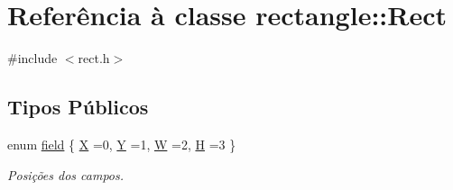 \hypertarget{classrectangle_1_1Rect}{\section{Referência à classe rectangle\-:\-:Rect}
\label{classrectangle_1_1Rect}
}


{\ttfamily \#include $<$rect.\-h$>$}

\subsection*{Tipos Públicos}
\begin{DoxyCompactItemize}
\item 
enum \hyperlink{classrectangle_1_1Rect_aadf60e07e4109c5fd25992fa057f8f02}{field} \{ \hyperlink{classrectangle_1_1Rect_aadf60e07e4109c5fd25992fa057f8f02abfd646e70d5cb6131897257d881c2d74}{X} =0, 
\hyperlink{classrectangle_1_1Rect_aadf60e07e4109c5fd25992fa057f8f02a791ad52b314764b48b5591fd780ef01d}{Y} =1, 
\hyperlink{classrectangle_1_1Rect_aadf60e07e4109c5fd25992fa057f8f02a4391d7047d7c16bf113e2049bd552a0a}{W} =2, 
\hyperlink{classrectangle_1_1Rect_aadf60e07e4109c5fd25992fa057f8f02ad988b7f76e5e524c2f3914e35c701bc8}{H} =3
 \}
\begin{DoxyCompactList}\small\item\em Posi\c{c}\~{o}es dos campos. \end{DoxyCompactList}\end{DoxyCompactItemize}

